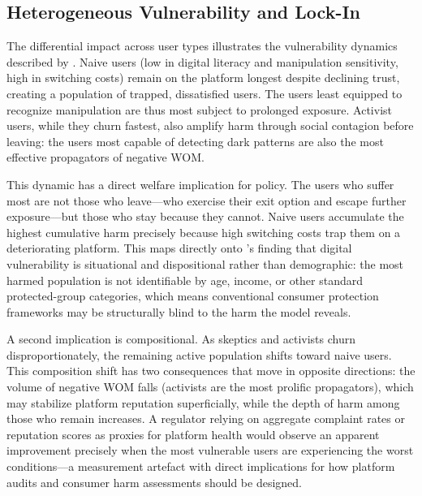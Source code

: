 \documentclass[a4paper]{article}
\begin{document}
\subsection{Heterogeneous Vulnerability and Lock-In}
The differential impact across user types illustrates the vulnerability dynamics described by \citet{rossi2024}. Naive users (low in digital literacy and manipulation sensitivity, high in switching costs) remain on the platform longest despite declining trust, creating a population of trapped, dissatisfied users. The users least equipped to recognize manipulation are thus most subject to prolonged exposure. Activist users, while they churn fastest, also amplify harm through social contagion before leaving: the users most capable of detecting dark patterns are also the most effective propagators of negative WOM.

This dynamic has a direct welfare implication for policy. The users who suffer most are not those who leave---who exercise their exit option and escape further exposure---but those who stay because they cannot. Naive users accumulate the highest cumulative harm precisely because high switching costs trap them on a deteriorating platform. This maps directly onto \citet{rossi2024}'s finding that digital vulnerability is situational and dispositional rather than demographic: the most harmed population is not identifiable by age, income, or other standard protected-group categories, which means conventional consumer protection frameworks may be structurally blind to the harm the model reveals.

A second implication is compositional. As skeptics and activists churn disproportionately, the remaining active population shifts toward naive users. This composition shift has two consequences that move in opposite directions: the volume of negative WOM falls (activists are the most prolific propagators), which may stabilize platform reputation superficially, while the depth of harm among those who remain increases. A regulator relying on aggregate complaint rates or reputation scores as proxies for platform health would observe an apparent improvement precisely when the most vulnerable users are experiencing the worst conditions---a measurement artefact with direct implications for how platform audits and consumer harm assessments should be designed.
\end{document}
